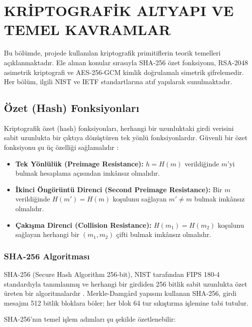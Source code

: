 \chapter{KRİPTOGRAFİK ALTYAPI VE TEMEL KAVRAMLAR}
\label{CH:BolumBir}

Bu bölümde, projede kullanılan kriptografik primitiflerin teorik temelleri açıklanmaktadır. Ele alınan konular sırasıyla SHA-256 özet fonksiyonu, RSA-2048 asimetrik kriptografi ve AES-256-GCM kimlik doğrulamalı simetrik şifrelemedir. Her bölüm, ilgili NIST ve IETF standartlarına atıf yapılarak sunulmaktadır.

	\section{Özet (Hash) Fonksiyonları} 

Kriptografik özet (hash) fonksiyonları, herhangi bir uzunluktaki girdi verisini sabit uzunlukta bir çıktıya dönüştüren tek yönlü fonksiyonlardır. Güvenli bir özet fonksiyonu şu üç özelliği sağlamalıdır \cite{KatzLindell}:

\begin{itemize}
    \item \textbf{Tek Yönlülük (Preimage Resistance):} $h = H(m)$ verildiğinde $m$'yi bulmak hesaplama açısından imkânsız olmalıdır.
    \item \textbf{İkinci Öngörüntü Direnci (Second Preimage Resistance):} Bir $m$ verildiğinde $H(m') = H(m)$ koşulunu sağlayan $m' \neq m$ bulmak imkânsız olmalıdır.
    \item \textbf{Çakışma Direnci (Collision Resistance):} $H(m_1) = H(m_2)$ koşulunu sağlayan herhangi bir $(m_1, m_2)$ çifti bulmak imkânsız olmalıdır.
\end{itemize}

	\subsection{SHA-256 Algoritması}

SHA-256 (Secure Hash Algorithm 256-bit), NIST tarafından FIPS 180-4 standardıyla tanımlanmış ve herhangi bir girdiden 256 bitlik sabit uzunlukta özet üreten bir algoritmalardır \cite{FIPS1804}. Merkle-Damgård yapısını kullanan SHA-256, girdi mesajını 512 bitlik bloklara böler; her blok 64 tur sıkıştırma işlemine tabi tutulur.

SHA-256'nın temel işlem adımları şu şekilde özetlenebilir:

